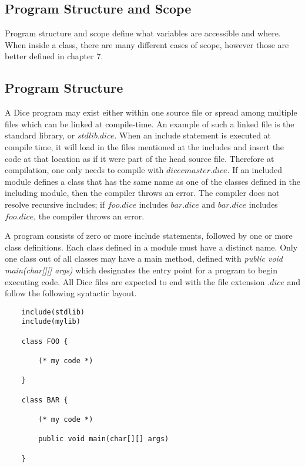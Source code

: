 \begin{homeworkProblem}
	\chapter{Program Structure and Scope}
	
	Program structure and scope define what variables are accessible and where. When inside a class, there are many different cases of scope, however those are better defined in chapter 7. 
	
	\section{Program Structure}
		
	A Dice program may exist either within one source file or spread among multiple files which can be linked at compile-time. An example of such a linked file is the standard library, or $stdlib.dice$. When an include statement is executed at compile time, it will load in the files mentioned at the includes and insert the code at that location as if it were part of the head source file. Therefore at compilation, one only needs to compile with $dicec master.dice$. If an included module defines a class that has the same name as one of the classes defined in the including module, then the compiler throws an error. The compiler does not resolve recursive includes; if $foo.dice$ includes $bar.dice$ and $bar.dice$ includes $foo.dice$, the compiler throws an error.

	A program consists of zero or more include statements, followed by one or more class definitions. Each class defined in a module must have a distinct name. Only one class out of all classes may have a main method, defined with \textit{public void main(char[][] args)} which designates the entry point for a program to begin executing code. All Dice files are expected to end with the file extension $.dice$ and follow the following syntactic layout. 
	
	\begin{verbatim}
	include(stdlib)
	include(mylib)
	
	class FOO {
	
		(* my code *)
	
	}
	
	class BAR {
	
		(* my code *)
		
		public void main(char[][] args)
	
	}
	\end{verbatim}


\end{homeworkProblem}
